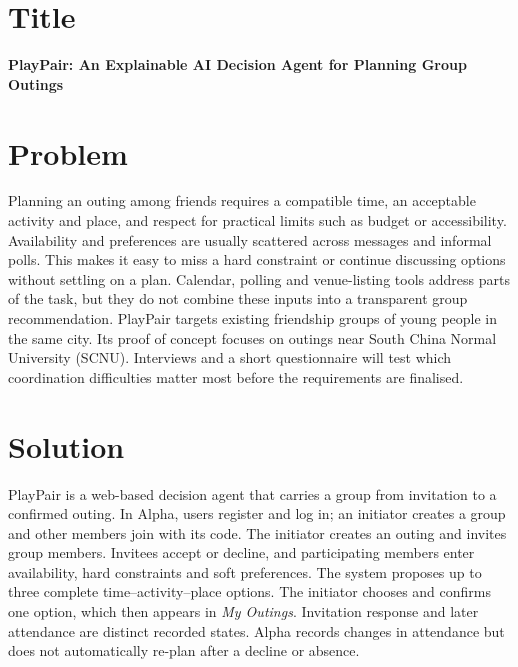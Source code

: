 \documentclass[12pt,a4paper]{article}
\begin{document}
\section*{Title}
\textbf{PlayPair: An Explainable AI Decision Agent for Planning Group Outings}

\section*{Problem}
Planning an outing among friends requires a compatible time, an acceptable activity and place, and respect for practical limits such as budget or accessibility. Availability and preferences are usually scattered across messages and informal polls. This makes it easy to miss a hard constraint or continue discussing options without settling on a plan. Calendar, polling and venue-listing tools address parts of the task, but they do not combine these inputs into a transparent group recommendation. PlayPair targets existing friendship groups of young people in the same city. Its proof of concept focuses on outings near South China Normal University (SCNU). Interviews and a short questionnaire will test which coordination difficulties matter most before the requirements are finalised.

\section*{Solution}
PlayPair is a web-based decision agent that carries a group from invitation to a confirmed outing. In Alpha, users register and log in; an initiator creates a group and other members join with its code. The initiator creates an outing and invites group members. Invitees accept or decline, and participating members enter availability, hard constraints and soft preferences. The system proposes up to three complete time--activity--place options. The initiator chooses and confirms one option, which then appears in \emph{My Outings}. Invitation response and later attendance are distinct recorded states. Alpha records changes in attendance but does not automatically re-plan after a decline or absence.
\end{document}
